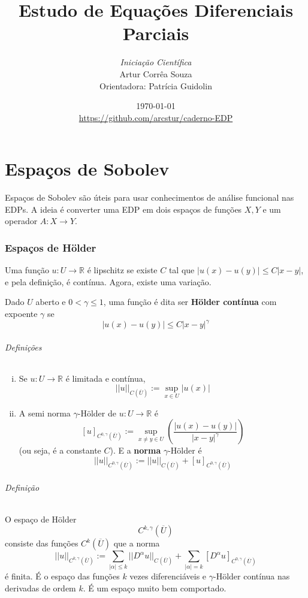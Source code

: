 \documentclass[11pt]{article}
\title{Estudo de Equações Diferenciais Parciais}
\author{\textit{Iniciação Científica}\\   Artur Corrêa Souza \\ Orientadora: Patrícia Guidolin}
\date{\today \\  \url{https://github.com/arcstur/caderno-EDP}}
\newcommand{\R}{\mathbb{R}}
\newcommand{\holder}[2][k,\gamma]{{C^{#1}(\overline{#2})}}
\begin{document}
\maketitle
\tableofcontents

% 

\setcounter{part}{1}
\part{Espaços de Sobolev}
Espaços de Sobolev são úteis para usar conhecimentos de análise funcional nas EDPs. A ideia é converter uma EDP em dois espaços de funções \( X,Y \) e um operador \( A:X \rightarrow Y \).

\newcommand{\sobolevdef}{W^{k,p}(U)}
\newcommand{\sobolevum}{W^{1,p}(U)}
\newcommand{\sobolevloc}{W^{k,p}_{loc}(U)}

\section{Espaços de Hölder}

Uma função \( u:U\rightarrow \R \) é lipschitz se existe \( C \) tal que \( |u(x)-u(y)| \leq C|x-y| \), e pela definição, é contínua. Agora, existe uma variação.

Dado \( U \) aberto e \( 0 < \gamma \leq 1 \), uma função é dita ser \textbf{Hölder contínua} com expoente \( \gamma \) se \[ |u(x)-u(y)| \leq C |x-y|^\gamma \]

\paragraph{Definições} \begin{enumerate}[(i)]
	\item Se \( u:U \rightarrow \R \) é limitada e contínua, \[ ||u||_{C(\overline{U})} := \sup_{x \in U} |u(x)| \]
	\item A semi norma \( \gamma \)-Hölder de \( u:U \rightarrow \R \) é \[ [u]_{C^{0,\gamma}(\overline{U})} := \sup_{x\neq y \in U} \left( \frac{|u(x) - u(y)|}{|x-y|^\gamma}\right) \] (ou seja, é a constante \( C \)). E a \textbf{norma} \( \gamma\)-Hölder é \[ ||u||_{C^{0,\gamma}(\overline{U})} := ||u||_{C(\overline{U})} + [u]_{C^{0,\gamma}(\overline{U})} \]
\end{enumerate}

\paragraph{Definição} O espaço de Hölder \[ \holder{U}  \] consiste das funções \( \holder[k]{U} \) que a norma \[ ||u||_{\holder{U}} := \sum_{|\alpha|\leq k} || D^\alpha u ||_{\holder[]{U}} + \sum_{|\alpha|=k} [ D^\alpha u ]_{\holder[0,\gamma]{U}} \] é finita. É o espaço das funções \( k\) vezes diferenciáveis e \( \gamma \)-Hölder contínua nas derivadas de ordem \( k \). É um espaço muito bem comportado.
\end{document}
